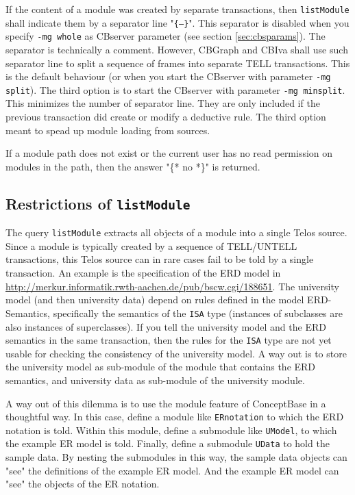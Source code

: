 If the content of a module was created by separate transactions, then
{\tt listModule} shall indicate them by a separator line "{\tt \{---\}}".
This separator is disabled when you specify {\tt -mg whole}
as CBserver parameter (see section \ref{sec:cbsparams}).
The separator is technically a comment. However, CBGraph and CBIva
shall use such separator line to split a sequence
of frames into separate TELL transactions.
This is the default behaviour (or when you start the CBserver with
parameter {\tt -mg split}). The third option is to start the CBserver with
parameter {\tt -mg minsplit}. This minimizes the number of separator line.
They are only included if the previous transaction did create or modify a
deductive rule. The third option meant to spead up module loading
from sources. 

If a module path does not exist or the current user has no
read permission on modules in the path, then the answer
"\{* no *\}" is returned.

\subsection{Restrictions of {\tt listModule}} \label{sec:listmod}

The query {\tt listModule} extracts all objects of a module into a single
Telos source. Since a module is typically created by a sequence of
TELL/UNTELL transactions, this Telos source can in rare cases fail to
be told by a single transaction. An example is the specification of
the ERD model in 
\url{http://merkur.informatik.rwth-aachen.de/pub/bscw.cgi/188651}.
The university model (and then university data) depend on rules
defined in the model ERD-Semantics, specifically the semantics of
the {\tt ISA} type (instances of subclasses are also instances
of superclasses). If you tell the university model and the ERD semantics in
the same transaction, then the rules for the {\tt ISA} type are not yet 
usable for checking the consistency of the university model.
A way out is to store the university model as sub-module of 
the module that contains the ERD semantics, and university data
as sub-module of the university module.

A way out of this dilemma is to use the module feature of ConceptBase
in a thoughtful way. In this case, define a module like {\tt ERnotation}
to which the ERD notation is told. Within this module, define a submodule
like {\tt UModel}, to which the example ER model is told. Finally,
define a submodule {\tt UData} to hold the sample data. By nesting the
submodules in this way, the sample data objects can "see" the definitions
of the example ER model. And the example ER model can "see" the objects
of the ER notation.

